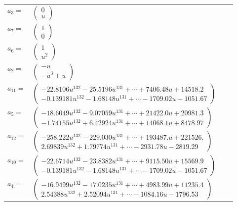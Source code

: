 \documentclass[1p]{elsarticle_modified}
\theoremstyle{definition}
\begin{document}
\begin{tabular}{m{7pt} m{180pt} m{7pt} m{180pt} }
\flushright $a_{3}=$&$\begin{pmatrix}0\\u\end{pmatrix}$ \\
\flushright $a_{7}=$&$\begin{pmatrix}1\\0\end{pmatrix}$ \\
\flushright $a_{6}=$&$\begin{pmatrix}1\\u^2\end{pmatrix}$ \\
\flushright $a_{2}=$&$\begin{pmatrix}- u\\- u^3+u\end{pmatrix}$ \\
\flushright $a_{11}=$&$\begin{pmatrix}-22.8106 u^{132}-25.5196 u^{131}+\cdots+7406.48 u+14518.2\\-0.139181 u^{132}-1.68148 u^{131}+\cdots-1709.02 u-1051.67\end{pmatrix}$ \\
\flushright $a_{5}=$&$\begin{pmatrix}-18.6049 u^{132}-9.07059 u^{131}+\cdots+21422.0 u+20981.3\\-1.74155 u^{132}+6.42924 u^{131}+\cdots+14068.1 u+8478.97\end{pmatrix}$ \\
\flushright $a_{12}=$&$\begin{pmatrix}-258.222 u^{132}-229.030 u^{131}+\cdots+193487. u+221526.\\2.69839 u^{132}+1.79774 u^{131}+\cdots-2931.78 u-2819.29\end{pmatrix}$ \\
\flushright $a_{10}=$&$\begin{pmatrix}-22.6714 u^{132}-23.8382 u^{131}+\cdots+9115.50 u+15569.9\\-0.139181 u^{132}-1.68148 u^{131}+\cdots-1709.02 u-1051.67\end{pmatrix}$ \\
\flushright $a_{4}=$&$\begin{pmatrix}-16.9499 u^{132}-17.0235 u^{131}+\cdots+4983.99 u+11235.4\\2.54388 u^{132}+2.52094 u^{131}+\cdots-1084.16 u-1796.53\end{pmatrix}$ \\

\end{tabular}
\end{document}
